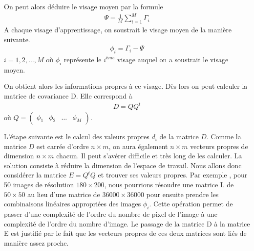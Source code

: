 On peut alors déduire le visage moyen par la formule 
\begin{eqnarray}
\Psi=\frac{1}{M}\sum_{i=1}^{M}{\Gamma_i}
\label{eq6}
\end{eqnarray}
A chaque visage d'apprentissage, on soustrait le visage moyen de la manière suivante.
\begin{eqnarray}
\phi_i=\Gamma_i -\Psi
\label{eq7}
\end{eqnarray}
$i=1, 2,\ldots, M$ où $\phi_i$ représente le $i^{ème}$ visage auquel on a soustrait le visage moyen.

 On obtient alors les informations propres à ce visage. Dès lors on peut calculer la matrice de covariance D. Elle correspond à
\begin{eqnarray}
D=QQ^{t}
\label{eq8}
\end{eqnarray}
où $Q=\begin{pmatrix} \phi_1&\phi_2 &\ldots&\phi_M\end{pmatrix}$.

L'étape suivante est le calcul des valeurs propres $d_i$ de la matrice $D$. Comme la matrice $D$ est carrée d'ordre $n\times m$, on aura également $n\times m$ vecteurs propres de dimension $n\times m$ chacun. Il peut s'avérer difficile et très long de les calculer. La solution consiste à réduire la dimension de l'espace de travail. Nous allons donc considérer la matrice $E=Q^tQ$ et trouver ses valeurs propres. Par  exemple \citep{SAB}, pour 50 images de résolution $180\times200$, nous pourrions résoudre une  matrice L de $50\times50$ au lieu d'une matrice de $36000\times 36000 $ pour ensuite prendre les  combinaisons  linéaires  appropriées  des  images $\phi_i$. Cette opération permet de passer d'une complexité de l'ordre du nombre de pixel de l'image à une complexité de l'ordre du nombre d'image. Le passage de la matrice D à la matrice E est justifié par le fait que les vecteurs propres de ces deux matrices sont liés de manière assez proche.

